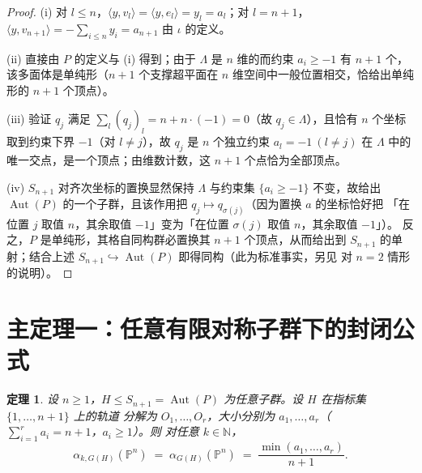 \documentclass[11pt,a4paper]{article}
\newtheorem{theorem}{定理}[section]
\theoremstyle{definition}
\theoremstyle{remark}
\DeclareMathOperator{\Aut}{Aut}
\newcommand{\N}{\mathbb{N}}
\newcommand{\PP}{\mathbb{P}}
\begin{document}
\begin{proof}
(i) 对 $l \le n$，$\langle y,v_l\rangle = \langle y, e_l\rangle = y_l = a_l$；对 $l = n+1$，
$\langle y, v_{n+1}\rangle = -\sum_{i\le n} y_i = a_{n+1}$ 由 $\iota$ 的定义。

(ii) 直接由 $P$ 的定义与 (i) 得到；由于 $\Lambda$ 是 $n$ 维的而约束 $a_i \ge -1$ 有 $n+1$ 个，
该多面体是单纯形（$n+1$ 个支撑超平面在 $n$ 维空间中一般位置相交，恰给出单纯形的 $n+1$ 个顶点）。

(iii) 验证 $q_j$ 满足 $\sum_l (q_j)_l = n + n\cdot(-1) = 0$（故 $q_j \in \Lambda$），且恰有
$n$ 个坐标取到约束下界 $-1$（对 $l \ne j$），故 $q_j$ 是 $n$ 个独立约束 $a_l = -1\ (l\ne j)$
在 $\Lambda$ 中的唯一交点，是一个顶点；由维数计数，这 $n+1$ 个点恰为全部顶点。

(iv) $S_{n+1}$ 对齐次坐标的置换显然保持 $\Lambda$ 与约束集 $\{a_i \ge -1\}$ 不变，故给出
$\Aut(P)$ 的一个子群，且该作用把 $q_j \mapsto q_{\sigma(j)}$（因为置换 $a$ 的坐标恰好把
「在位置 $j$ 取值 $n$，其余取值 $-1$」变为「在位置 $\sigma(j)$ 取值 $n$，其余取值 $-1$」）。
反之，$P$ 是单纯形，其格自同构群必置换其 $n+1$ 个顶点，从而给出到 $S_{n+1}$ 的单射；结合上述
$S_{n+1} \hookrightarrow \Aut(P)$ 即得同构（此为标准事实，另见 \cite[Example 8.1]{JR2025} 对
$n=2$ 情形的说明）。
\end{proof}

\section{主定理一：任意有限对称子群下的封闭公式}

\begin{theorem}\label{thm:main}
设 $n \ge 1$，$H \le S_{n+1} = \Aut(P)$ 为任意子群。设 $H$ 在指标集 $\{1,\dots,n+1\}$ 上的轨道
分解为 $O_1,\dots,O_r$，大小分别为 $a_1,\dots,a_r$（$\sum_{i=1}^r a_i = n+1$，$a_i \ge 1$）。则
对任意 $k \in \N$，
\[
  \alpha_{k,G(H)}(\PP^n) \;=\; \alpha_{G(H)}(\PP^n) \;=\; \frac{\min(a_1,\dots,a_r)}{n+1}.
\]
\end{theorem}
\end{document}
